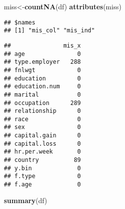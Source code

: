 \documentclass[12pt,]{article}
\newenvironment{Shaded}{\begin{snugshade}}{\end{snugshade}}
\newcommand{\CommentTok}[1]{\textcolor[rgb]{0.56,0.35,0.01}{\textit{#1}}}
\newcommand{\KeywordTok}[1]{\textcolor[rgb]{0.13,0.29,0.53}{\textbf{#1}}}
\newcommand{\NormalTok}[1]{#1}
\newcommand{\OperatorTok}[1]{\textcolor[rgb]{0.81,0.36,0.00}{\textbf{#1}}}
\begin{document}
\begin{Shaded}
\begin{Highlighting}[]
\NormalTok{miss<-}\KeywordTok{countNA}\NormalTok{(df)}
\KeywordTok{attributes}\NormalTok{(miss)}
\end{Highlighting}
\end{Shaded}

\begin{verbatim}
## $names
## [1] "mis_col" "mis_ind"
\end{verbatim}

\begin{Shaded}
\end{Shaded}

\begin{verbatim}
##               mis_x
## age               0
## type.employer   288
## fnlwgt            0
## education         0
## education.num     0
## marital           0
## occupation      289
## relationship      0
## race              0
## sex               0
## capital.gain      0
## capital.loss      0
## hr.per.week       0
## country          89
## y.bin             0
## f.type            0
## f.age             0
\end{verbatim}

\begin{Shaded}
\begin{Highlighting}[]
\KeywordTok{summary}\NormalTok{(df)}
\end{Highlighting}
\end{Shaded}
\end{document}
